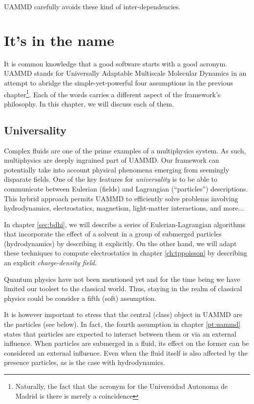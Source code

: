 \documentclass[ twoside,openright,titlepage,numbers=noenddot,%
headinclude,footinclude,cleardoublepage=empty,abstract=on,
BCOR=5mm,paper=a4,fontsize=11pt, dvipsnames
]{scrreprt}
\newcommand{\uammd}{\gls{UAMMD}\xspace}
\begin{document}
\uammd carefully avoids these kind of inter-dependencies.

\chapter{It's in the name}\label{ch:design}

It is common knowledge that a good software starts with a good acronym. \uammd stands for Universally Adaptable Multiscale Molecular Dynamics in an attempt to abridge the simple-yet-powerful four assumptions in the previous chapter\footnote{Naturally, the fact that the acronym for the Universidad Autonoma de Madrid is there is merely a coincidence}. Each of the words carries a different aspect of the framework's philosophy. In this chapter, we will discuss each of them.
\section{\uppercase{\textbf{U}}niversality}

Complex fluids are one of the prime examples of a multiphysics system. As such, multiphysics are deeply ingrained part of \uammd. Our framework can potentially take into account physical phenomena emerging from seemingly disparate fields.
One of the key features for \emph{universality} is to be able to communicate between Eulerian (fields) and Lagrangian (``particles'') descriptions. This hybrid approach permits \uammd to efficiently solve problems involving hydrodynamics, electrostatics, magnetism, light-matter interactions, and more... 
  
In chapter \ref{sec:bdhi}, we will describe a series of Eulerian-Lagrangian algorithms that incorporate the effect of a solvent in a group of submerged particles (hydrodynamics) by describing it explicitly. On the other hand, we will adapt these techniques to compute electrostatics in chapter \ref{ch:tppoisson} by describing an explicit \emph{charge-density field}.

Quantum physics have not been mentioned yet and for the time being we have limited our toolset to the classical world. Thus, staying in the realm of classical physics could be consider a fifth (soft) assumption.

It is however important to stress that the central (class) object in \uammd are the particles (see below). In fact, the fourth assumption in chapter \ref{pt:uammd} states that particles are expected to interact between them or via an external influence. When particles are submerged in a fluid, its effect on the former can be considered an external influence. Even when the fluid itself is also affected by the presence particles, as is the case with hydrodynamics.
\end{document}

